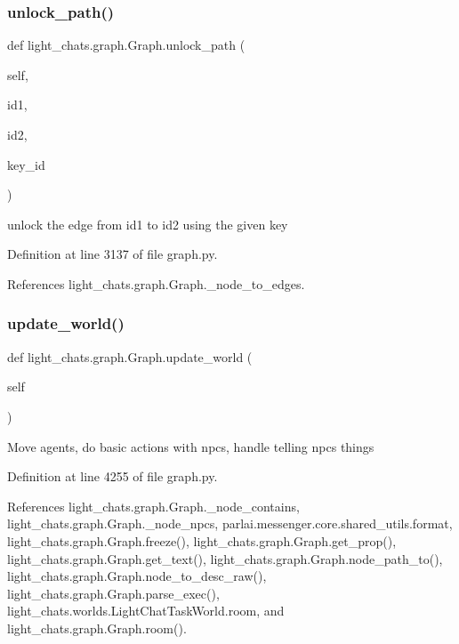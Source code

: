 \subsubsection{\texorpdfstring{unlock\+\_\+path()}{unlock\_path()}}
{\footnotesize\ttfamily def light\+\_\+chats.\+graph.\+Graph.\+unlock\+\_\+path (\begin{DoxyParamCaption}\item[{}]{self,  }\item[{}]{id1,  }\item[{}]{id2,  }\item[{}]{key\+\_\+id }\end{DoxyParamCaption})}

\begin{DoxyVerb}unlock the edge from id1 to id2 using the given key\end{DoxyVerb}
 

Definition at line 3137 of file graph.\+py.



References light\+\_\+chats.\+graph.\+Graph.\+\_\+node\+\_\+to\+\_\+edges.

\mbox{\label{classlight__chats_1_1graph_1_1Graph_ab4e757d18538326e65b8ed2dce71d9fa}} 
\subsubsection{\texorpdfstring{update\+\_\+world()}{update\_world()}}
{\footnotesize\ttfamily def light\+\_\+chats.\+graph.\+Graph.\+update\+\_\+world (\begin{DoxyParamCaption}\item[{}]{self }\end{DoxyParamCaption})}

\begin{DoxyVerb}Move agents, do basic actions with npcs, handle telling npcs things
\end{DoxyVerb}
 

Definition at line 4255 of file graph.\+py.



References light\+\_\+chats.\+graph.\+Graph.\+\_\+node\+\_\+contains, light\+\_\+chats.\+graph.\+Graph.\+\_\+node\+\_\+npcs, parlai.\+messenger.\+core.\+shared\+\_\+utils.\+format, light\+\_\+chats.\+graph.\+Graph.\+freeze(), light\+\_\+chats.\+graph.\+Graph.\+get\+\_\+prop(), light\+\_\+chats.\+graph.\+Graph.\+get\+\_\+text(), light\+\_\+chats.\+graph.\+Graph.\+node\+\_\+path\+\_\+to(), light\+\_\+chats.\+graph.\+Graph.\+node\+\_\+to\+\_\+desc\+\_\+raw(), light\+\_\+chats.\+graph.\+Graph.\+parse\+\_\+exec(), light\+\_\+chats.\+worlds.\+Light\+Chat\+Task\+World.\+room, and light\+\_\+chats.\+graph.\+Graph.\+room().


